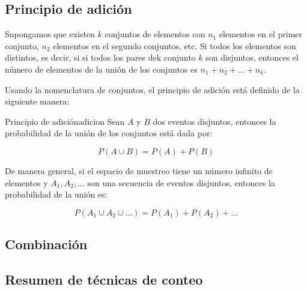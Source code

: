 \subsection{Principio de adición}

Supongamos que existen $k$ conjuntos de elementos con $n_1$ elementos en el
primer conjunto, $n_2$ elementos en el segundo conjuntos, etc. Si todos los
elementos son distintos, es decir, si si todos los pares dek conjunto $k$ son
disjuntos, entonces el número de elementos de la unión de los conjuntos es $n_1
+ n_2 + ... + n_k $.

Usando la nomenclatura de conjuntos, el principio de adición está definido de la
siguiente manera:

\begin{theorem}{Principio de adición}{adicion}
Sean $A$ y $B$ dos eventos disjuntos, entonces la probabilidad de la unión de
los conjuntos está dada por:

\begin{equation}
	P(A \cup B) = P(A) + P(B)
\end{equation}

De manera general, si el espacio de muestreo tiene un número infinito de
elementos y $A_1, A_2, ... $ son una secuencia de eventos disjuntos, entonces la
probabilidad de la unión es:

\begin{equation}
	P(A_1 \cup A_2 \cup ...) = P(A_1) + P(A_2) + ...
\end{equation}

\end{theorem}





\subsection{Combinación}





\subsection{Resumen de técnicas de conteo}

